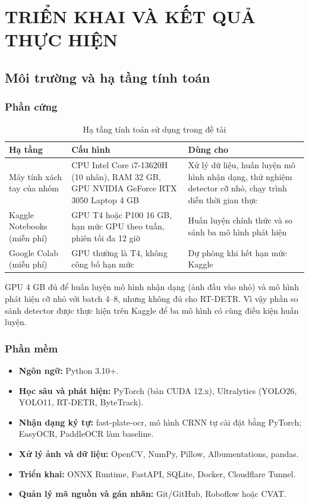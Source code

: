 \chapter{TRIỂN KHAI VÀ KẾT QUẢ THỰC HIỆN}

\section{Môi trường và hạ tầng tính toán}

\subsection{Phần cứng}

\begin{table}[H]
\centering
\small
\begin{tabularx}{\textwidth}{|>{\RaggedRight}p{3.8cm}|>{\RaggedRight}X|>{\RaggedRight\arraybackslash}p{4.6cm}|}
\hline
\textbf{Hạ tầng} & \textbf{Cấu hình} & \textbf{Dùng cho} \\
\hline
Máy tính xách tay của nhóm & CPU Intel Core i7-13620H (10 nhân), RAM 32 GB, GPU NVIDIA GeForce RTX 3050 Laptop 4 GB & Xử lý dữ liệu, huấn luyện mô hình nhận dạng, thử nghiệm detector cỡ nhỏ, chạy trình diễn thời gian thực \\
\hline
Kaggle Notebooks (miễn phí) & GPU T4 hoặc P100 16 GB, hạn mức GPU theo tuần, phiên tối đa 12 giờ & Huấn luyện chính thức và so sánh ba mô hình phát hiện \\
\hline
Google Colab (miễn phí) & GPU thường là T4, không công bố hạn mức & Dự phòng khi hết hạn mức Kaggle \\
\hline
\end{tabularx}
\caption{Hạ tầng tính toán sử dụng trong đề tài}
\label{tab:hardware}
\end{table}

GPU 4 GB đủ để huấn luyện mô hình nhận dạng (ảnh đầu vào nhỏ) và mô hình phát hiện cỡ nhỏ với batch 4--8, nhưng không đủ cho RT-DETR. Vì vậy phần so sánh detector được thực hiện trên Kaggle để ba mô hình có cùng điều kiện huấn luyện.

\subsection{Phần mềm}

\begin{itemize}
  \item \textbf{Ngôn ngữ:} Python 3.10+.
  \item \textbf{Học sâu và phát hiện:} PyTorch (bản CUDA 12.x), Ultralytics (YOLO26, YOLO11, RT-DETR, ByteTrack).
  \item \textbf{Nhận dạng ký tự:} fast-plate-ocr, mô hình CRNN tự cài đặt bằng PyTorch; EasyOCR, PaddleOCR làm baseline.
  \item \textbf{Xử lý ảnh và dữ liệu:} OpenCV, NumPy, Pillow, Albumentations, pandas.
  \item \textbf{Triển khai:} ONNX Runtime, FastAPI, SQLite, Docker, Cloudflare Tunnel.
  \item \textbf{Quản lý mã nguồn và gán nhãn:} Git/GitHub, Roboflow hoặc CVAT.
\end{itemize}

